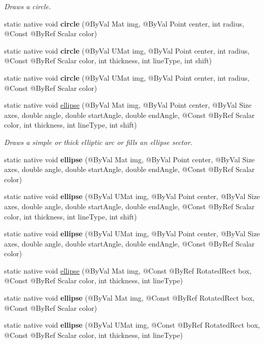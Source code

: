 \begin{DoxyCompactItemize}
\begin{DoxyCompactList}\small\item\em Draws a circle. \end{DoxyCompactList}\item 
static native void {\bfseries circle} (@By\+Val Mat img, @By\+Val Point center, int radius, @Const @By\+Ref Scalar color)
\item 
static native void {\bfseries circle} (@By\+Val U\+Mat img, @By\+Val Point center, int radius, @Const @By\+Ref Scalar color, int thickness, int line\+Type, int shift)
\item 
static native void {\bfseries circle} (@By\+Val U\+Mat img, @By\+Val Point center, int radius, @Const @By\+Ref Scalar color)
\item 
static native void \hyperlink{group__imgproc__draw_ga775ad50d707d4e99bd6f123f702e55a2}{ellipse} (@By\+Val Mat img, @By\+Val Point center, @By\+Val Size axes, double angle, double start\+Angle, double end\+Angle, @Const @By\+Ref Scalar color, int thickness, int line\+Type, int shift)
\begin{DoxyCompactList}\small\item\em Draws a simple or thick elliptic arc or fills an ellipse sector. \end{DoxyCompactList}\item 
static native void {\bfseries ellipse} (@By\+Val Mat img, @By\+Val Point center, @By\+Val Size axes, double angle, double start\+Angle, double end\+Angle, @Const @By\+Ref Scalar color)
\item 
static native void {\bfseries ellipse} (@By\+Val U\+Mat img, @By\+Val Point center, @By\+Val Size axes, double angle, double start\+Angle, double end\+Angle, @Const @By\+Ref Scalar color, int thickness, int line\+Type, int shift)
\item 
static native void {\bfseries ellipse} (@By\+Val U\+Mat img, @By\+Val Point center, @By\+Val Size axes, double angle, double start\+Angle, double end\+Angle, @Const @By\+Ref Scalar color)
\item 
static native void \hyperlink{group__imgproc__draw_gad8f98cdfda176a2e4e1560740c6b5adb}{ellipse} (@By\+Val Mat img, @Const @By\+Ref Rotated\+Rect box, @Const @By\+Ref Scalar color, int thickness, int line\+Type)
\item 
static native void {\bfseries ellipse} (@By\+Val Mat img, @Const @By\+Ref Rotated\+Rect box, @Const @By\+Ref Scalar color)
\item 
static native void {\bfseries ellipse} (@By\+Val U\+Mat img, @Const @By\+Ref Rotated\+Rect box, @Const @By\+Ref Scalar color, int thickness, int line\+Type)

\end{DoxyCompactItemize}
